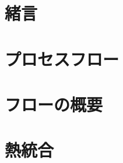 \documentclass[11pt,aspectratio=43,dvipsnames]{beamer}
\begin{document}
\setcounter{framenumber}{0}
\section{緒言}
\section{プロセスフロー}
\section{フローの概要}
\section{熱統合}
\end{document}
